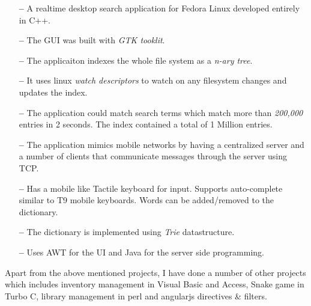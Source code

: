 \documentclass{cv}
\begin{document}
\begin{description}[leftmargin=50pt,labelwidth=50pt]
\begin{itemize}[label={},leftmargin=10pt,topsep=0pt]
      \item[\textbf{--}] A realtime desktop search application for Fedora Linux developed entirely in C++.
      \item[\textbf{--}] The GUI was built with \textit{GTK tooklit}.
      \item[\textbf{--}] The applicaiton indexes the whole file system as a \textit{n-ary tree}.
      \item[\textbf{--}] It uses linux \textit{watch descriptors} to watch on any filesystem changes and updates the index.
      \item[\textbf{--}] The application could match search terms which match more than \textit{200,000} entries in 2 seconds.  The index contained a total of 1 Million entries.
    \end{itemize}
  \item[SMS Simulator] \hfill
    \begin{itemize}[label={},leftmargin=10pt,topsep=0pt]
      \item[\textbf{--}] The application mimics mobile networks by having a centralized server and a number of clients that communicate messages through the server using TCP\@.
      \item[\textbf{--}] Has a mobile like Tactile keyboard for input.  Supports auto-complete similar to T9 mobile keyboards.  Words can be added/removed to the dictionary.
      \item[\textbf{--}] The dictionary is implemented using \textit{Trie} datastructure.
      \item[\textbf{--}] Uses AWT for the UI and Java for the server side programming.
    \end{itemize}
\end{description}
Apart from the above mentioned projects, I have done a number of other projects which includes inventory management in Visual Basic and Access, Snake game in Turbo C, library management in perl and angularjs directives \& filters.
\end{document}
